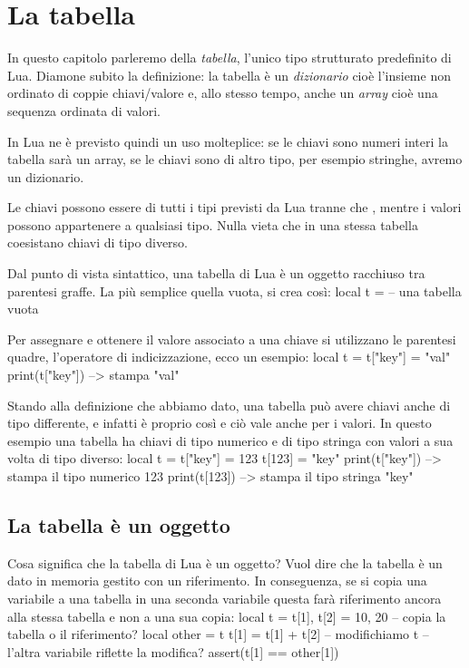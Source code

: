 

\chapter{La tabella}
\label{iChTabella}

In questo capitolo parleremo della \emph{tabella}, l'unico tipo strutturato
predefinito di Lua. Diamone subito la definizione: la tabella è un
\emph{dizionario} cioè l'insieme non ordinato di coppie chiavi/valore e, allo
stesso tempo, anche un \emph{array} cioè una sequenza ordinata di valori.

In Lua ne è previsto quindi un uso molteplice: se le chiavi sono numeri interi
la tabella sarà un array, se le chiavi sono di altro tipo, per esempio stringhe,
avremo un dizionario.

Le chiavi possono essere di tutti i tipi previsti da Lua tranne che ,
mentre i valori possono appartenere a qualsiasi tipo. Nulla vieta che in una
stessa tabella coesistano chiavi di tipo diverso.

Dal punto di vista sintattico, una tabella di Lua è un oggetto racchiuso tra
parentesi graffe. La più semplice quella vuota, si crea così:
\lines
local t = {} -- una tabella vuota
\endlines
{}

Per assegnare e ottenere il valore associato a una chiave si utilizzano le
parentesi quadre, l'operatore di indicizzazione, ecco un esempio:
\lines
local t = {}
t["key"] = "val"
print(t["key"]) --> stampa "val"
\endlines
{}

Stando alla definizione che abbiamo dato, una tabella può avere chiavi anche di
tipo differente, e infatti è proprio così e ciò vale anche per i valori. In
questo esempio una tabella ha chiavi di tipo numerico e di tipo stringa con
valori a sua volta di tipo diverso:
\lines
local t = {}
t["key"] = 123
t[123] = "key"
print(t["key"]) --> stampa il tipo numerico 123
print(t[123])   --> stampa il tipo stringa "key"
\endlines
{}


\section{La tabella è un oggetto}

Cosa significa che la tabella di Lua è un oggetto? Vuol dire che la tabella è
un dato in memoria gestito con un riferimento. In conseguenza, se si copia una
variabile a una tabella in una seconda variabile questa farà riferimento ancora
alla stessa tabella e non a una sua copia:
\lines
local t = {}
t[1], t[2] = 10, 20
-- copia la tabella o il riferimento?
local other = t
t[1] = t[1] + t[2] -- modifichiamo t
-- l'altra variabile riflette la modifica?
assert(t[1] == other[1])
\endlines
{}

